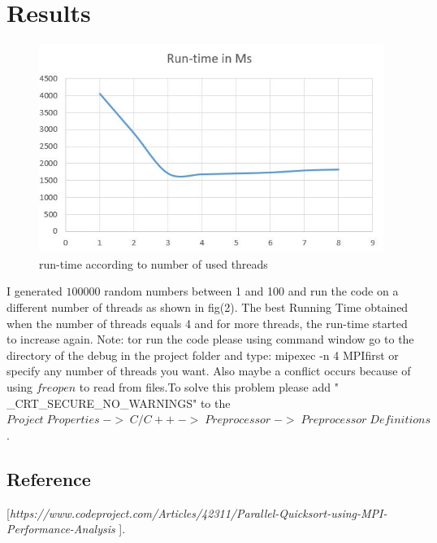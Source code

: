 \documentclass[preprint,pre,floats,aps,amsmath,amssymb]{revtex4}
\begin{document}
\section{Results}
\label{sec:results}
\begin{figure}[h]
	\centering
	\caption{run-time according to number of used threads}
	\includegraphics[scale=0.5]{2} 
	
\end{figure}
I generated $100000$ random numbers between 1 and 100 and run the code on a different number of threads as shown in fig(2). The best Running Time obtained when the number of threads equals 4 and for more threads, the run-time started to increase again.
Note:
tor run the code please using command window go to the directory of the debug in the project folder and type:\newline
mipexec -n 4 MPIfirst\newline
or specify any number of threads you want. Also maybe a conflict occurs because of using $ freopen$ to read from files.To solve this problem please add " \_CRT\_SECURE\_NO\_WARNINGS" to the $ Project\; Properties\; ->\; C/C++\;->\;Preprocessor\;->\;Preprocessor\;Definitions $. 

\newpage


\begin{thebibliography}{9}
	\section{Reference}
 
	[\textit{https://www.codeproject.com/Articles/42311/Parallel-Quicksort-using-MPI-Performance-Analysis }]. 

	

	
\end{thebibliography}
\appendix*
\end{document}
